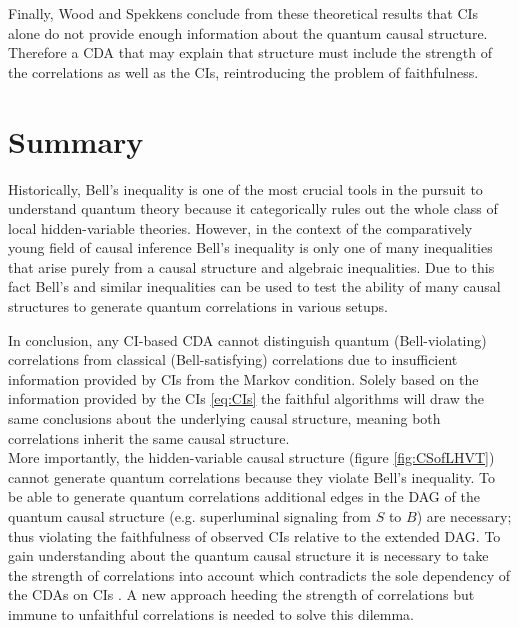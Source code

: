 Finally, Wood and Spekkens \cite{Wood.2015} conclude from these theoretical results that \acp{CI} alone do not provide enough information about the quantum causal structure.
Therefore a \ac{CDA} that may explain that structure must include the strength of the correlations as well as the \acp{CI}, reintroducing the problem of faithfulness.

\chapter{Summary}
\label{Summary}

Historically, Bell's inequality is one of the most crucial tools in the pursuit to understand quantum theory because it categorically rules out the whole class of local hidden-variable theories.
However, in the context of the comparatively young field of causal inference Bell's inequality is only one of many inequalities that arise purely from a causal structure and algebraic inequalities.
Due to this fact Bell's and similar inequalities can be used to test the ability of many causal structures to generate quantum correlations in various setups.

In conclusion, any \ac{CI}-based \ac{CDA} cannot distinguish quantum (Bell-violating) correlations from classical (Bell-satisfying) correlations due to insufficient information provided by \acp{CI} from the Markov condition. Solely based on the information provided by the \acp{CI} \eqref{eq:CIs} the faithful algorithms will draw the same conclusions about the underlying causal structure, meaning both correlations inherit the same causal structure.\\
More importantly, the hidden-variable causal structure (figure \ref{fig:CSofLHVT}) cannot generate quantum correlations because they violate Bell's inequality.
To be able to generate quantum correlations additional edges in the \ac{DAG} of the quantum causal structure (e.g. superluminal signaling from $S$ to $B$) are necessary; thus violating the faithfulness of observed \acp{CI} relative to the extended \ac{DAG}.
To gain understanding about the quantum causal structure it is necessary to take the strength of correlations into account which contradicts the sole dependency of the \acp{CDA} on \acp{CI} \cite{Wood.2015}.
A new approach heeding the strength of correlations but immune to unfaithful correlations is needed to solve this dilemma.
